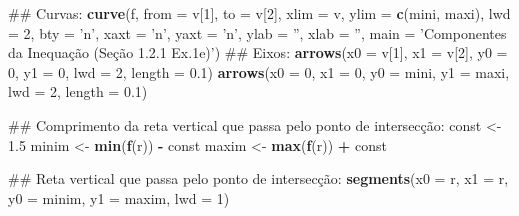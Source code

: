 \documentclass[]{book}
\newenvironment{Shaded}{\begin{snugshade}}{\end{snugshade}}
\newcommand{\KeywordTok}[1]{\textcolor[rgb]{0.13,0.29,0.53}{\textbf{#1}}}
\newcommand{\DataTypeTok}[1]{\textcolor[rgb]{0.13,0.29,0.53}{#1}}
\newcommand{\DecValTok}[1]{\textcolor[rgb]{0.00,0.00,0.81}{#1}}
\newcommand{\FloatTok}[1]{\textcolor[rgb]{0.00,0.00,0.81}{#1}}
\newcommand{\StringTok}[1]{\textcolor[rgb]{0.31,0.60,0.02}{#1}}
\newcommand{\OperatorTok}[1]{\textcolor[rgb]{0.81,0.36,0.00}{\textbf{#1}}}
\newcommand{\NormalTok}[1]{#1}
\begin{document}
\begin{enumerate}
\begin{Shaded}
\begin{Highlighting}[]
\NormalTok{##  Curvas:}
\KeywordTok{curve}\NormalTok{(f, }\DataTypeTok{from =}\NormalTok{ v[}\DecValTok{1}\NormalTok{], }\DataTypeTok{to =}\NormalTok{ v[}\DecValTok{2}\NormalTok{], }\DataTypeTok{xlim =}\NormalTok{ v, }\DataTypeTok{ylim =} \KeywordTok{c}\NormalTok{(mini, maxi), }\DataTypeTok{lwd =} \DecValTok{2}\NormalTok{,}
  \DataTypeTok{bty =} \StringTok{'n'}\NormalTok{, }\DataTypeTok{xaxt =} \StringTok{'n'}\NormalTok{, }\DataTypeTok{yaxt =} \StringTok{'n'}\NormalTok{, }\DataTypeTok{ylab =} \StringTok{''}\NormalTok{, }\DataTypeTok{xlab =} \StringTok{''}\NormalTok{,}
  \DataTypeTok{main =} \StringTok{'Componentes da Inequação (Seção 1.2.1 Ex.1e)'}\NormalTok{)}
\NormalTok{##  Eixos:}
\KeywordTok{arrows}\NormalTok{(}\DataTypeTok{x0 =}\NormalTok{ v[}\DecValTok{1}\NormalTok{], }\DataTypeTok{x1 =}\NormalTok{ v[}\DecValTok{2}\NormalTok{],}
   \DataTypeTok{y0 =} \DecValTok{0}\NormalTok{, }\DataTypeTok{y1 =} \DecValTok{0}\NormalTok{, }\DataTypeTok{lwd =} \DecValTok{2}\NormalTok{, }\DataTypeTok{length =} \FloatTok{0.1}\NormalTok{)}
\KeywordTok{arrows}\NormalTok{(}\DataTypeTok{x0 =} \DecValTok{0}\NormalTok{, }\DataTypeTok{x1 =} \DecValTok{0}\NormalTok{,}
   \DataTypeTok{y0 =}\NormalTok{ mini, }\DataTypeTok{y1 =}\NormalTok{ maxi, }\DataTypeTok{lwd =} \DecValTok{2}\NormalTok{, }\DataTypeTok{length =} \FloatTok{0.1}\NormalTok{)}

\NormalTok{##  Comprimento da reta vertical que passa pelo ponto de intersecção:}
\NormalTok{const <-}\StringTok{ }\FloatTok{1.5}
\NormalTok{minim <-}\StringTok{ }\KeywordTok{min}\NormalTok{(}\KeywordTok{f}\NormalTok{(r)) }\OperatorTok{-}\StringTok{ }\NormalTok{const}
\NormalTok{maxim <-}\StringTok{ }\KeywordTok{max}\NormalTok{(}\KeywordTok{f}\NormalTok{(r)) }\OperatorTok{+}\StringTok{ }\NormalTok{const}

\NormalTok{##  Reta vertical que passa pelo ponto de intersecção:}
\KeywordTok{segments}\NormalTok{(}\DataTypeTok{x0 =}\NormalTok{ r, }\DataTypeTok{x1 =}\NormalTok{ r,}
     \DataTypeTok{y0 =}\NormalTok{ minim, }\DataTypeTok{y1 =}\NormalTok{ maxim, }\DataTypeTok{lwd =} \DecValTok{1}\NormalTok{)}


\end{Highlighting}
\end{Shaded}
\end{enumerate}
\end{document}
